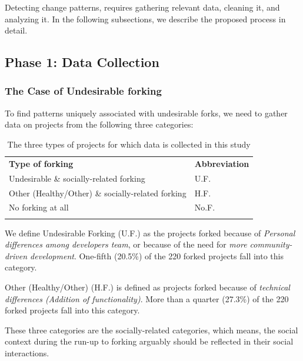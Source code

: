 \documentclass[11pt]{report}
\begin{document}
Detecting change patterns, requires gathering  relevant data, cleaning it, and analyzing it. In the following subsections, we describe the proposed process in detail. 

\subsection{Phase 1: Data Collection}
\label{DataCollection}

\subsubsection{The Case of Undesirable forking}
To find patterns uniquely associated with undesirable forks, we need to gather data on projects from the following three categories: 

\begin{table} [H]
\caption[Undesirable forking vs. Other categories]{The three types of projects for which data is collected in this study}
\label{tableUndesirableForkingDataCollect} 
\begin{tabular}{p{} p{}}
\hline\noalign{\smallskip}
\textbf{Type of forking} & \textbf{Abbreviation} \\
\noalign{\smallskip}\hline\noalign{\smallskip}
Undesirable \& socially-related forking & U.F. \\ \hline
Other (Healthy/Other) \& socially-related forking & H.F. \\\hline
No forking at all & No.F. \\
\noalign{\smallskip}\hline
\end{tabular}
\end{table}

We define Undesirable Forking (U.F.) as the projects forked because of \textit{Personal differences among developers team}, or because of the need for \textit{more community-driven development}. One-fifth (20.5\%) of the 220 forked projects fall into this category.

Other (Healthy/Other) (H.F.) is defined as projects forked because of \textit{technical differences (Addition of functionality)}. More than a quarter (27.3\%) of the 220 forked projects fall into this category.

These three categories are the socially-related categories, which means, the social context during the run-up to forking arguably should be reflected in their social interactions. 
\end{document}
